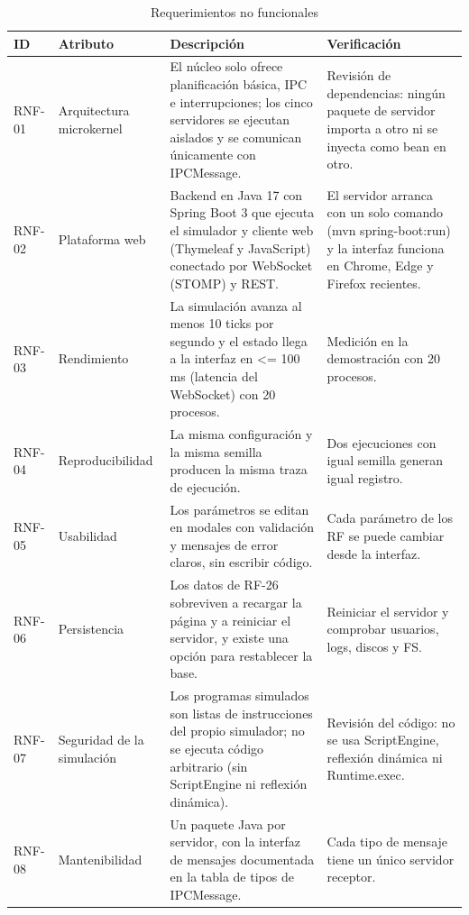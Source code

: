\documentclass[conference]{IEEEtran}
\begin{document}
\begin{table}[!t]
\caption{Requerimientos no funcionales}
\label{tab:rnf}
\footnotesize\renewcommand{\arraystretch}{1.1}\setlength{\tabcolsep}{3pt}
\begin{tabular}{|>{\raggedright\arraybackslash}p{1.2cm}|>{\raggedright\arraybackslash}p{3.0cm}|>{\raggedright\arraybackslash}p{8.2cm}|>{\raggedright\arraybackslash}p{4.6cm}|}
\hline
\textbf{ID} & \textbf{Atributo} & \textbf{Descripción} & \textbf{Verificación}\\ \hline
RNF-01 & Arquitectura microkernel & El núcleo solo ofrece planificación básica, IPC e interrupciones; los cinco servidores se ejecutan aislados y se comunican únicamente con IPCMessage. & Revisión de dependencias: ningún paquete de servidor importa a otro ni se inyecta como bean en otro.\\ \hline
RNF-02 & Plataforma web & Backend en Java 17 con Spring Boot 3 que ejecuta el simulador y cliente web (Thymeleaf y JavaScript) conectado por WebSocket (STOMP) y REST. & El servidor arranca con un solo comando (mvn spring-boot:run) y la interfaz funciona en Chrome, Edge y Firefox recientes.\\ \hline
RNF-03 & Rendimiento & La simulación avanza al menos 10 ticks por segundo y el estado llega a la interfaz en \textless{}= 100 ms (latencia del WebSocket) con 20 procesos. & Medición en la demostración con 20 procesos.\\ \hline
RNF-04 & Reproducibilidad & La misma configuración y la misma semilla producen la misma traza de ejecución. & Dos ejecuciones con igual semilla generan igual registro.\\ \hline
RNF-05 & Usabilidad & Los parámetros se editan en modales con validación y mensajes de error claros, sin escribir código. & Cada parámetro de los RF se puede cambiar desde la interfaz.\\ \hline
RNF-06 & Persistencia & Los datos de RF-26 sobreviven a recargar la página y a reiniciar el servidor, y existe una opción para restablecer la base. & Reiniciar el servidor y comprobar usuarios, logs, discos y FS.\\ \hline
RNF-07 & Seguridad de la simulación & Los programas simulados son listas de instrucciones del propio simulador; no se ejecuta código arbitrario (sin ScriptEngine ni reflexión dinámica). & Revisión del código: no se usa ScriptEngine, reflexión dinámica ni Runtime.exec.\\ \hline
RNF-08 & Mantenibilidad & Un paquete Java por servidor, con la interfaz de mensajes documentada en la tabla de tipos de IPCMessage. & Cada tipo de mensaje tiene un único servidor receptor.\\ \hline

\end{tabular}
\end{table}
\end{document}
